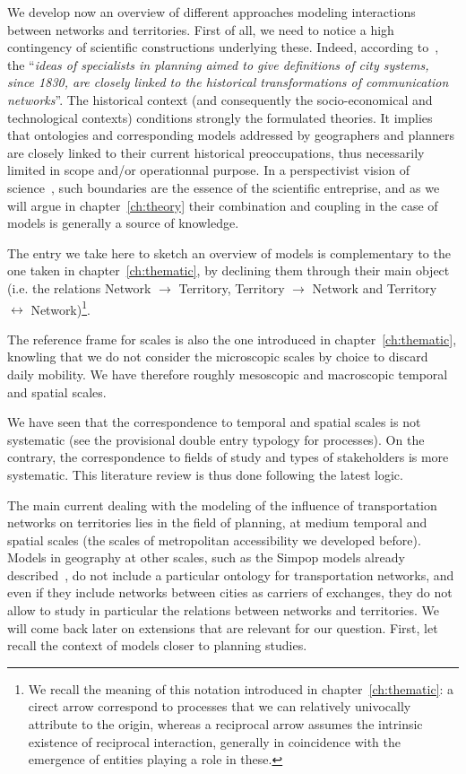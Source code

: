 \documentclass[galley]{jtlu-article-2col}
\begin{document}
We develop now an overview of different approaches modeling interactions between networks and territories. First of all, we need to notice a high contingency of scientific constructions underlying these. Indeed, according to~\cite{bretagnolle2002time}, the ``\textit{ideas of specialists in planning aimed to give definitions of city systems, since 1830, are closely linked to the historical transformations of communication networks}''. The historical context (and consequently the socio-economical and technological contexts) conditions strongly the formulated theories. It implies that ontologies and corresponding models addressed by geographers and planners are closely linked to their current historical preoccupations, thus necessarily limited in scope and/or operationnal purpose. In a perspectivist vision of science~\cite{giere2010scientific}, such boundaries are the essence of the scientific entreprise, and as we will argue in chapter~\ref{ch:theory} their combination and coupling in the case of models is generally a source of knowledge.

The entry we take here to sketch an overview of models is complementary to the one taken in chapter~\ref{ch:thematic}, by declining them through their main object (i.e. the relations Network $\rightarrow$ Territory, Territory $\rightarrow$ Network and Territory $\leftrightarrow$ Network)\footnote{We recall the meaning of this notation introduced in chapter~\ref{ch:thematic}: a cirect arrow correspond to processes that we can relatively univocally attribute to the origin, whereas a reciprocal arrow assumes the intrinsic existence of reciprocal interaction, generally in coincidence with the emergence of entities playing a role in these.}.

The reference frame for scales is also the one introduced in chapter~\ref{ch:thematic}, knowling that we do not consider the microscopic scales by choice to discard daily mobility. We have therefore roughly mesoscopic and macroscopic temporal and spatial scales.

We have seen that the correspondence to temporal and spatial scales is not systematic (see the provisional double entry typology for processes). On the contrary, the correspondence to fields of study and types of stakeholders is more systematic. This literature review is thus done following the latest logic.

The main current dealing with the modeling of the influence of transportation networks on territories lies in the field of planning, at medium temporal and spatial scales (the scales of metropolitan accessibility we developed before). Models in geography at other scales, such as the Simpop models already described~\cite{pumain2012multi}, do not include a particular ontology for transportation networks, and even if they include networks between cities as carriers of exchanges, they do not allow to study in particular the relations between networks and territories. We will come back later on extensions that are relevant for our question. First, let recall the context of models closer to planning studies.
\end{document}
